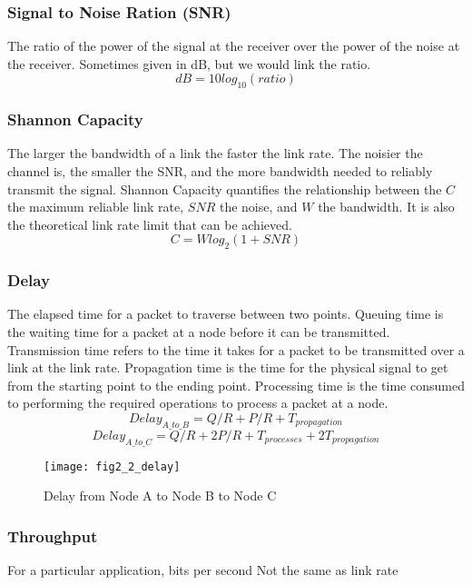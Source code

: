 \subsubsection*{Signal to Noise Ration (SNR)}
The ratio of the power of the signal at the receiver over the power of the noise at the receiver. Sometimes given in dB, but we would link the ratio. 
$$dB = 10log_{10}(ratio)$$
\subsubsection*{Shannon Capacity}
The larger the bandwidth of a link the faster the link rate. The noisier the channel is, the smaller the SNR, and the more bandwidth needed to reliably transmit the signal. Shannon Capacity quantifies the relationship between the $C$ the maximum reliable link rate, $SNR$ the noise, and $W$ the bandwidth. It is also the theoretical link rate limit that can be achieved. 
 $$C = Wlog_2(1+SNR)$$
\subsubsection*{Delay}
The elapsed time for a packet to traverse between two points. Queuing time is the waiting time for a packet at a node before it can be transmitted. Transmission time refers to the time it takes for a packet to be transmitted over a link at the link rate. Propagation time is the time for the physical signal to get from the starting point to the ending point. Processing time is the time consumed to performing the required operations to process a packet at a node. 
$$Delay_{A\_to\_B} = Q/R + P/R + T_{propagation}$$
$$Delay_{A\_to\_C} = Q/R + 2P/R + T_{processes} + 2T_{propagation}$$

\begin{figure}[!htbp]
    \centering
    \texttt{[image: fig2\_2\_delay]}
    \caption{Delay from Node A to Node B to Node C}
    \label{fig:Delay}
\end{figure}

\subsubsection*{Throughput}
For a particular application, bits per second Not the same as link rate

